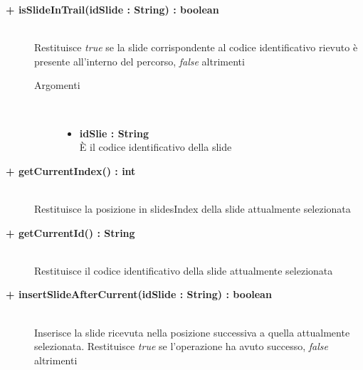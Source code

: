 \begin{description}
	\begin{description}
		\item[\textbf{\color{blue}+ isSlideInTrail(idSlide : String) : boolean			}] \hfill \\
			Restituisce \textit{true} se la slide corrispondente al codice identificativo rievuto è presente all'interno del percorso, \textit{false} altrimenti
			
		\begin{description}
			\item[Argomenti] \hfill \\
				\begin{itemize}
				
					\item \textbf{idSlie : String	} \hfill \\
					È il codice identificativo della slide
					
				\end{itemize}
			
		\end{description}
			
	\end{description}
	
	\begin{description}
		\item[\textbf{\color{blue}+ getCurrentIndex() : int			}] \hfill \\
			Restituisce la posizione in slidesIndex della slide attualmente selezionata
			
	\end{description}
	
	\begin{description}
		\item[\textbf{\color{blue}+ getCurrentId() : String			}] \hfill \\
			Restituisce il codice identificativo della slide attualmente selezionata
			
	\end{description}
	
	\begin{description}
		\item[\textbf{\color{blue}+ insertSlideAfterCurrent(idSlide : String) : boolean			}] \hfill \\
			Inserisce la slide ricevuta nella posizione successiva a quella attualmente selezionata. Restituisce \textit{true} se l'operazione ha avuto successo, \textit{false} altrimenti
			

\end{description}
\end{description}
